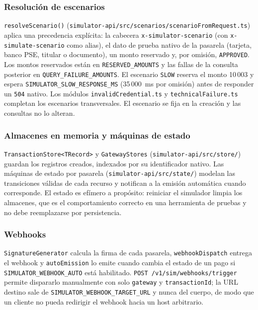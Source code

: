 \subsubsection{Resolución de escenarios}
\texttt{resolveScenario()} (\texttt{simulator-api/src/scenarios/scenarioFromRequest.ts}) aplica una precedencia explícita: la cabecera \texttt{x-simulator-scenario} (con \texttt{x-simulate-scenario} como alias), el dato de prueba nativo de la pasarela (tarjeta, banco PSE, titular o documento), un monto reservado y, por omisión, \texttt{APPROVED}. Los montos reservados están en \texttt{RESERVED\_AMOUNTS} y las fallas de la consulta posterior en \texttt{QUERY\_FAILURE\_AMOUNTS}. El escenario \texttt{SLOW} reserva el monto 10\,003 y espera \texttt{SIMULATOR\_SLOW\_RESPONSE\_MS} (35\,000~ms por omisión) antes de responder un \texttt{504} nativo. Los módulos \texttt{invalidCredential.ts} y \texttt{technicalFailure.ts} completan los escenarios transversales. El escenario se fija en la creación y las consultas no lo alteran.

\subsubsection{Almacenes en memoria y máquinas de estado}
\texttt{TransactionStore<TRecord>} y \texttt{GatewayStores} (\texttt{simulator-api/src/store/}) guardan los registros creados, indexados por su identificador nativo. Las máquinas de estado por pasarela (\texttt{simulator-api/src/state/}) modelan las transiciones válidas de cada recurso y notifican a la emisión automática cuando corresponde. El estado es efímero a propósito: reiniciar el simulador limpia los almacenes, que es el comportamiento correcto en una herramienta de pruebas y no debe reemplazarse por persistencia.

\subsubsection{Webhooks}
\texttt{SignatureGenerator} calcula la firma de cada pasarela, \texttt{webhookDispatch} entrega el webhook y \texttt{autoEmission} lo emite cuando cambia el estado de un pago si \texttt{SIMULATOR\_\allowbreak{}WEBHOOK\_\allowbreak{}AUTO} está habilitado. \texttt{POST /\allowbreak{}v1/\allowbreak{}sim/\allowbreak{}webhooks/\allowbreak{}trigger} permite dispararlo manualmente con solo \texttt{gateway} y \texttt{transactionId}; la URL destino sale de \texttt{SIMULATOR\_\allowbreak{}WEBHOOK\_\allowbreak{}TARGET\_\allowbreak{}URL} y nunca del cuerpo, de modo que un cliente no pueda redirigir el webhook hacia un host arbitrario.

